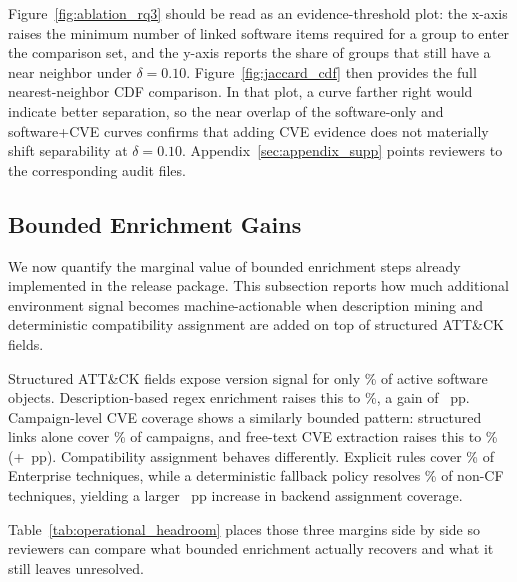 \documentclass[sigconf]{acmart}
\begin{document}
Figure~\ref{fig:ablation_rq3} should be read as an evidence-threshold plot: the x-axis raises the minimum number of linked software items required for a group to enter the comparison set, and the y-axis reports the share of groups that still have a near neighbor under $\delta = 0.10$. Figure~\ref{fig:jaccard_cdf} then provides the full nearest-neighbor CDF comparison. In that plot, a curve farther right would indicate better separation, so the near overlap of the software-only and software+CVE curves confirms that adding CVE evidence does not materially shift separability at $\delta = 0.10$. Appendix~\ref{sec:appendix_supp} points reviewers to the corresponding audit files.

\subsection{Bounded Enrichment Gains}

We now quantify the marginal value of bounded enrichment steps already implemented in the release package. This subsection reports how much additional environment signal becomes machine-actionable when description mining and deterministic compatibility assignment are added on top of structured ATT\&CK fields.

Structured ATT\&CK fields expose version signal for only \softwarewithversionsignalpercentage\% of active software objects. Description-based regex enrichment raises this to \softwareversionenrichedtotalpct\%, a gain of \softwareversionenrichmentgainpp~pp. Campaign-level CVE coverage shows a similarly bounded pattern: structured links alone cover \entcampaignswithcvestructuredpct\% of campaigns, and free-text CVE extraction raises this to \entcampaignswithcvepct\% (+\entcampaignswithcveenrichmentgainpp~pp). Compatibility assignment behaves differently. Explicit rules cover \compatibilityrulecoveragepercentage\% of Enterprise techniques, while a deterministic fallback policy resolves \compatibilitynoncfresolvedpercentage\% of non-CF techniques, yielding a larger \compatibilityresolutiongainpp~pp increase in backend assignment coverage.

Table~\ref{tab:operational_headroom} places those three margins side by side so reviewers can compare what bounded enrichment actually recovers and what it still leaves unresolved.
\end{document}
